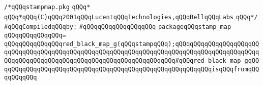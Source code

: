 \label{src/lib/compiler/front/typer-stuff/basics/stampmap.pkg}
\verb|/*qQQqstampmap.pkg|\newline
\verb|qQQq*|\newline
\verb|qQQq*qQQq(C)qQQq2001qQQqLucentqQQqTechnologies,qQQqBellqQQqLabs|\newline
\verb|qQQq*/|\newline
\newline
\verb|#qQQqCompiledqQQqby:|\newline
\verb|#qQQqqQQqqQQqqQQqqQQq|\newline
\newline
\verb|packageqQQqstamp_map|\newline
\verb|qQQqqQQqqQQqqQQq=|\newline
\verb|qQQqqQQqqQQqqQQqred_black_map_g(qQQqstampqQQq);qQQqqQQqqQQqqQQqqQQqqQQqqQQqqQQqqQQqqQQqqQQqqQQqqQQqqQQqqQQqqQQqqQQqqQQqqQQqqQQqqQQqqQQqqQQqqQQqqQQqqQQqqQQqqQQqqQQqqQQqqQQqqQQqqQQqqQQqqQQq#qQQqred_black_map_gqQQqqQQqqQQqqQQqqQQqqQQqqQQqqQQqqQQqqQQqqQQqqQQqqQQqqQQqqQQqisqQQqfromqQQqqQQqqQQq|\newline
\newline

